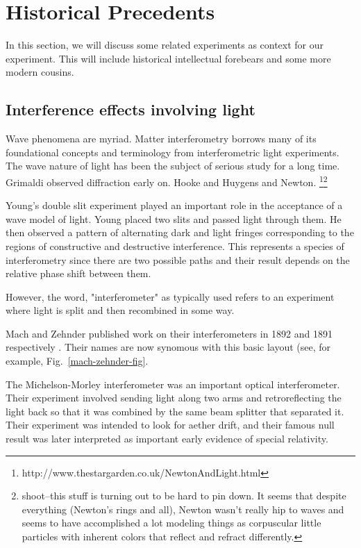 \section{Historical Precedents}
In this section, we will discuss some related experiments as context for our experiment. This will include historical intellectual forebears and some more modern cousins. 
 \subsection{Interference effects involving light}
Wave phenomena are myriad. Matter interferometry borrows many of its foundational concepts and terminology from interferometric light experiments.
The wave nature of light has been the subject of serious study for a long time.
Grimaldi observed diffraction early on. Hooke and Huygens and Newton. \footnote{http://www.thestargarden.co.uk/NewtonAndLight.html}\footnote{shoot--this stuff is turning out to be hard to pin down. It seems that despite everything (Newton's rings and all), Newton wasn't really hip to waves and seems to have accomplished a lot modeling things as corpuscular little particles with inherent colors that reflect and refract differently.}

Young's double slit experiment played an important role in the acceptance of a wave model of light. Young placed two slits and passed light through them. He then observed a pattern of alternating dark and light fringes corresponding to the regions of constructive and destructive interference. This represents a species of interferometry since there are two possible paths and their result depends on the relative phase shift between them. 

However, the word, "interferometer" as typically used refers to an experiment where light is split and then recombined in some way. 

Mach and Zehnder published work on their interferometers in 1892 and 1891 respectively \cite{zehnder}\cite{mach}. Their names are now synomous with this basic layout (see, for example, Fig.~\ref{mach-zehnder-fig}.  

The Michelson-Morley interferometer was an important optical interferometer. Their experiment involved sending light along two arms and retroreflecting the light back so that it was combined by the same beam splitter that separated it. Their experiment was intended to look for aether drift, and their famous null result was later interpreted as important early evidence of special relativity. 

